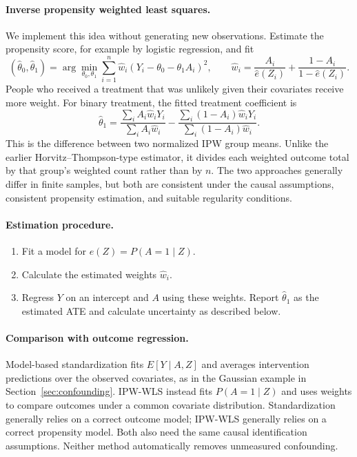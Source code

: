 \documentclass[11pt,twoside]{article}
\begin{document}
\paragraph{Inverse propensity weighted least squares.}
We implement this idea without generating new observations. Estimate the propensity score, for example by logistic regression, and fit
\[
 (\hat\theta_0,\hat\theta_1)
 =\arg\min_{\theta_0,\theta_1}
 \sum_{i=1}^n\hat w_i(Y_i-\theta_0-\theta_1A_i)^2,
 \qquad
 \hat w_i=\frac{A_i}{\hat e(Z_i)}+\frac{1-A_i}{1-\hat e(Z_i)}.
\]
People who received a treatment that was unlikely given their covariates receive more weight. For binary treatment, the fitted treatment coefficient is
\[
 \hat\theta_1=
 \frac{\sum_i A_i\hat w_iY_i}{\sum_i A_i\hat w_i}
 -\frac{\sum_i(1-A_i)\hat w_iY_i}{\sum_i(1-A_i)\hat w_i}.
\]
This is the difference between two normalized IPW group means. Unlike the earlier Horvitz--Thompson-type estimator, it divides each weighted outcome total by that group's weighted count rather than by $n$. The two approaches generally differ in finite samples, but both are consistent under the causal assumptions, consistent propensity estimation, and suitable regularity conditions.

\paragraph{Estimation procedure.}
\begin{enumerate}
 \item Fit a model for $e(Z)=P(A=1\mid Z)$.
 \item Calculate the estimated weights $\hat w_i$.
 \item Regress $Y$ on an intercept and $A$ using these weights. Report $\hat\theta_1$ as the estimated ATE and calculate uncertainty as described below.
\end{enumerate}

\paragraph{Comparison with outcome regression.}
Model-based standardization fits $E[Y\mid A,Z]$ and averages intervention predictions over the observed covariates, as in the Gaussian example in Section~\ref{sec:confounding}. IPW-WLS instead fits $P(A=1\mid Z)$ and uses weights to compare outcomes under a common covariate distribution. Standardization generally relies on a correct outcome model; IPW-WLS generally relies on a correct propensity model. Both also need the same causal identification assumptions. Neither method automatically removes unmeasured confounding.
\end{document}
